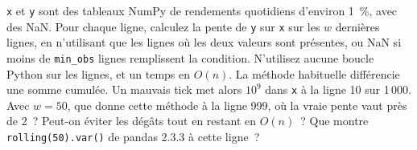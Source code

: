 \begin{question}\label{iq:iv3:python-and-pandas:40}
\texttt{x} et \texttt{y} sont des tableaux NumPy de rendements quotidiens d'environ 1~\%, avec des NaN. Pour chaque ligne, calculez la pente de \texttt{y} sur \texttt{x} sur les $w$ dernières lignes, en n'utilisant que les lignes où les deux valeurs sont présentes, ou NaN si moins de \texttt{min\_obs} lignes remplissent la condition. N'utilisez aucune boucle Python sur les lignes, et un temps en $O(n)$. La méthode habituelle différencie une somme cumulée. Un mauvais tick met alors $10^9$ dans \texttt{x} à la ligne 10 sur 1\,000. Avec $w = 50$, que donne cette méthode à la ligne 999, où la vraie pente vaut près de 2~? Peut-on éviter les dégâts tout en restant en $O(n)$~? Que montre \texttt{rolling(50).var()} de pandas 2.3.3 à cette ligne~?
\end{question}
